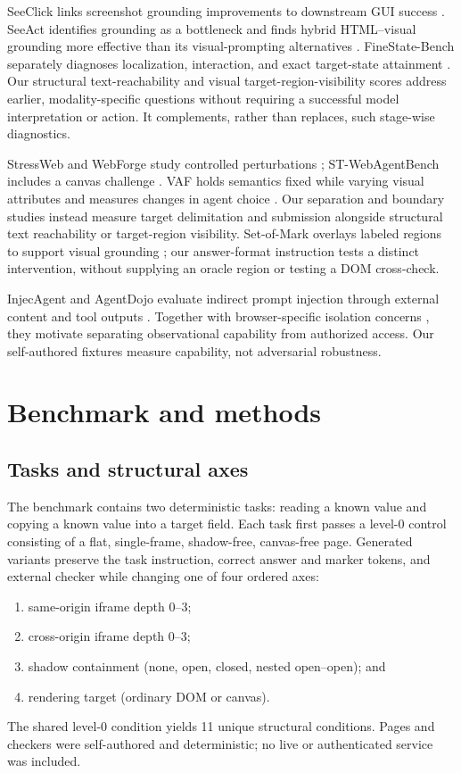 \documentclass{article}
\begin{document}
SeeClick links screenshot grounding improvements to downstream GUI success \citep{cheng2024seeclick}. SeeAct identifies grounding as a bottleneck and finds hybrid HTML--visual grounding more effective than its visual-prompting alternatives \citep{zheng2024seeact}. FineState-Bench separately diagnoses localization, interaction, and exact target-state attainment \citep{ji2026finestate}. Our structural text-reachability and visual target-region-visibility scores address earlier, modality-specific questions without requiring a successful model interpretation or action. It complements, rather than replaces, such stage-wise diagnostics.

StressWeb and WebForge study controlled perturbations \citep{bai2026stressweb,yuan2026webforge}; ST-WebAgentBench includes a canvas challenge \citep{levy2026stwebagentbench}. VAF holds semantics fixed while varying visual attributes and measures changes in agent choice \citep{yu2026visualattributes}. Our separation and boundary studies instead measure target delimitation and submission alongside structural text reachability or target-region visibility. Set-of-Mark overlays labeled regions to support visual grounding \citep{yang2023setofmark}; our answer-format instruction tests a distinct intervention, without supplying an oracle region or testing a DOM cross-check.

InjecAgent and AgentDojo evaluate indirect prompt injection through external content and tool outputs \citep{zhan2024injecagent,debenedetti2024agentdojo}. Together with browser-specific isolation concerns \citep{roesner2026agentic}, they motivate separating observational capability from authorized access. Our self-authored fixtures measure capability, not adversarial robustness.

\section{Benchmark and methods}
\label{sec:methods}

\subsection{Tasks and structural axes}

The benchmark contains two deterministic tasks: reading a known value and copying a known value into a target field. Each task first passes a level-0 control consisting of a flat, single-frame, shadow-free, canvas-free page. Generated variants preserve the task instruction, correct answer and marker tokens, and external checker while changing one of four ordered axes:
\begin{enumerate}
  \item same-origin iframe depth 0--3;
  \item cross-origin iframe depth 0--3;
  \item shadow containment (none, open, closed, nested open--open); and
  \item rendering target (ordinary DOM or canvas).
\end{enumerate}
The shared level-0 condition yields 11 unique structural conditions. Pages and checkers were self-authored and deterministic; no live or authenticated service was included.
\end{document}
